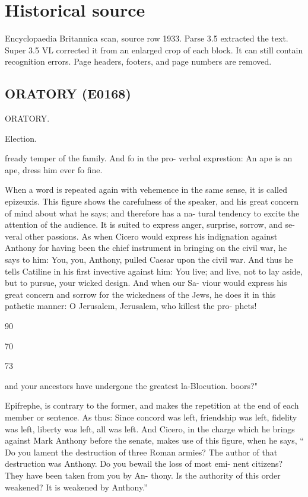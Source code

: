 \documentclass{article}
\begin{document}
\section*{Historical source}
Encyclopaedia Britannica scan, source row 1933. Parse 3.5 extracted the text. Super 3.5 VL corrected it from an enlarged crop of each block. It can still contain recognition errors.
Page headers, footers, and page numbers are removed.

\subsection*{ORATORY (E0168)}
ORATORY.

Election.

fready temper of the family. And fo in the pro-
verbal exprestion: An ape is an ape, dress him ever
fo fine.

When a word is repeated again with vehemence in
the same sense, it is called epizeuxis. This figure shows
the carefulness of the speaker, and his great concern
of mind about what he says; and therefore has a na-
tural tendency to excite the attention of the audience.
It is suited to express anger, surprise, sorrow, and se-
veral other passions. As when Cicero would express
his indignation against Anthony for having been the
chief instrument in bringing on the civil war, he says
to him: You, you, Anthony, pulled Caesar upon the
civil war. And thus he tells Catiline in his first invective
against him: You live; and live, not to lay aside,
but to pursue, your wicked design. And when our Sa-
viour would express his great concern and sorrow for
the wickedness of the Jews, he does it in this pathetic
manner: O Jerusalem, Jerusalem, who killest the pro-
phets!

90

70

73

and your ancestors have undergone the greatest la-Blocution.
boors?"

Epifrephe, is contrary to the former, and makes
the repetition at the end of each member or sentence.
As thus: Since concord was left, friendship was left,
fidelity was left, liberty was left, all was left. And
Cicero, in the charge which he brings against Mark
Anthony before the senate, makes use of this figure,
when he says, “ Do you lament the destruction of
three Roman armies? The author of that destruction
was Anthony. Do you bewail the loss of most emi-
nent citizens? They have been taken from you by An-
thony. Is the authority of this order weakened? It
is weakened by Anthony.”
\end{document}
